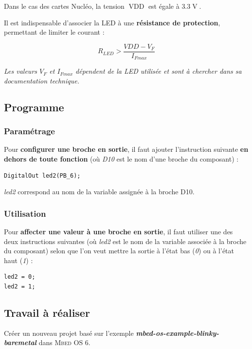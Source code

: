 \documentclass[a4paper,11pt,titlepage]{article} %
\begin{document}
Dans le cas des cartes Nucléo, la tension $\operatorname{VDD}$ est égale à $3.3\operatorname{V}$.

Il est indispensable d'associer la LED à une \textbf{résistance de protection}, permettant de limiter le courant : 

$$R_{LED} > \frac{VDD - V_{F}}{I_{Fmax}}$$

\textit{Les valeurs $V_F$ et $I_{Fmax}$ dépendent de la LED utilisée et sont à chercher dans sa documentation technique.}


\subsection{Programme}

\subsubsection{Paramétrage}

Pour \textbf{configurer une broche en sortie}, il faut ajouter l'instruction suivante \textbf{en dehors de toute fonction} (où \textsl{D10} est le nom d'une broche du composant) :

\begin{lstlisting}
DigitalOut led2(PB_6);
\end{lstlisting}

\textsl{led2} correspond au nom de la variable assignée à la broche \textsc{D10}.

\subsubsection{Utilisation}

Pour \textbf{affecter une valeur à une broche en sortie}, il faut utiliser une des deux instructions suivantes (où \textsl{led2} est le nom de la variable associée à la broche du composant) selon que l'on veut mettre la sortie à l'état bas (\textit{0}) ou à l'état haut (\textit{1}) :

\begin{lstlisting}
led2 = 0;
led2 = 1;
\end{lstlisting}


\subsection{Travail à réaliser}

\Manip Créer un nouveau projet basé sur l'exemple \textbf{\textsl{mbed-os-example-blinky-baremetal}} dans \textsc{Mbed OS 6}.
\end{document}
